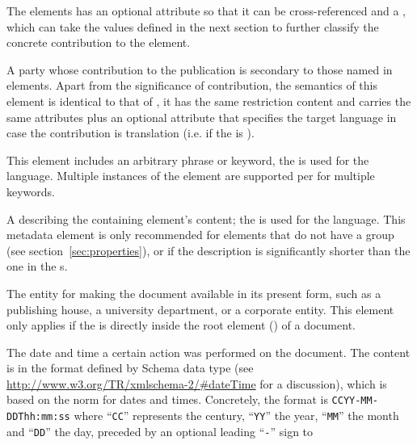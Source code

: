 \begin{description}
  The {} elements has an optional attribute
  {} so that it can be cross-referenced and a
  {}, which can take the values defined in the next section
  to further classify the concrete contribution to the element.
\item[{\eldef{Contributor}}] A party whose contribution to the publication is
  secondary to those named in {} elements.  Apart from the
  significance of contribution, the semantics of this element is identical to that
  of {}, it has the same restriction content and carries the same
  attributes plus an optional {} attribute that
  specifies the target language in case the contribution is translation (i.e. if
  the {} is {}).
\item[{\eldef{Subject}}] This element includes an arbitrary phrase or keyword, the
  {} is used for the language. Multiple instances
  of the {} element are supported per
  {} for multiple keywords.
\item[{\eldef{Description}}] A {} describing the containing element's content; the
  {} is used for the language. This metadata
  element is only recommended for {} elements that do not have a
  {} group (see section~\ref{sec:properties}), or if the description
  is significantly shorter than the one in the {s}.
\item[{\eldef{Publisher}}] The entity for making the document available in its
  present form, such as a publishing house, a university department, or a
  corporate entity. This element only applies if the {} is
  directly inside the root element ({}) of a document.
\item[{\eldef{Date}}] The date and time a certain action was performed on the
  document. The content is in the format defined by {\xml} Schema data type
  {} (see {\url{http://www.w3.org/TR/xmlschema-2/#dateTime}} for a
  discussion), which is based on the {} norm for dates and
  times. Concretely, the format is {\tt{CCYY-MM-DDThh:mm:ss}} where ``{\tt{CC}}''
  represents the century, ``{\tt{YY}}'' the year, ``{\tt{MM}}'' the month and
  ``{\tt{DD}}'' the day, preceded by an optional leading ``{\tt{-}}'' sign to

\end{description}
